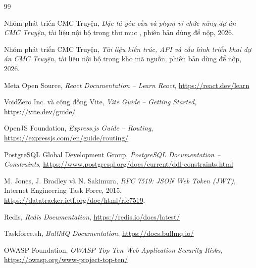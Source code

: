 \begin{thebibliography}{99}

Nhóm phát triển CMC Truyện,
\textit{Đặc tả yêu cầu và phạm vi chức năng dự án CMC Truyện},
tài liệu nội bộ trong thư mục , phiên bản dùng để nộp, 2026.

Nhóm phát triển CMC Truyện,
\textit{Tài liệu kiến trúc, API và cấu hình triển khai dự án CMC Truyện},
tài liệu nội bộ trong kho mã nguồn, phiên bản dùng để nộp, 2026.

Meta Open Source,
\textit{React Documentation -- Learn React},
\url{https://react.dev/learn}

VoidZero Inc. và cộng đồng Vite,
\textit{Vite Guide -- Getting Started},
\url{https://vite.dev/guide/}

OpenJS Foundation,
\textit{Express.js Guide -- Routing},
\url{https://expressjs.com/en/guide/routing/}

PostgreSQL Global Development Group,
\textit{PostgreSQL Documentation -- Constraints},
\url{https://www.postgresql.org/docs/current/ddl-constraints.html}

M. Jones, J. Bradley và N. Sakimura,
\textit{RFC 7519: JSON Web Token (JWT)},
Internet Engineering Task Force, 2015,
\url{https://datatracker.ietf.org/doc/html/rfc7519}.

Redis,
\textit{Redis Documentation},
\url{https://redis.io/docs/latest/}

Taskforce.sh,
\textit{BullMQ Documentation},
\url{https://docs.bullmq.io/}

OWASP Foundation,
\textit{OWASP Top Ten Web Application Security Risks},
\url{https://owasp.org/www-project-top-ten/}

\end{thebibliography}
